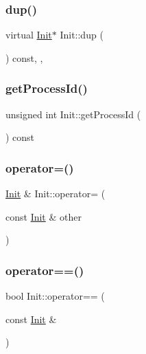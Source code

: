 \subsubsection{\texorpdfstring{dup()}{dup()}}
{\footnotesize\ttfamily virtual \hyperlink{class_init}{Init}$\ast$ Init\+::dup (\begin{DoxyParamCaption}{ }\end{DoxyParamCaption}) const\hspace{0.3cm}{\ttfamily [inline]}, {\ttfamily [override]}, {\ttfamily [virtual]}}

\mbox{\label{class_init_a73d525231ae76ad98442d6f5b86bb994}} 
\subsubsection{\texorpdfstring{get\+Process\+Id()}{getProcessId()}}
{\footnotesize\ttfamily unsigned int Init\+::get\+Process\+Id (\begin{DoxyParamCaption}{ }\end{DoxyParamCaption}) const\hspace{0.3cm}{\ttfamily [virtual]}}

\mbox{\label{class_init_ab995dd231981ed97018c00b5fd8e9797}} 
\subsubsection{\texorpdfstring{operator=()}{operator=()}}
{\footnotesize\ttfamily \hyperlink{class_init}{Init} \& Init\+::operator= (\begin{DoxyParamCaption}\item[{const \hyperlink{class_init}{Init} \&}]{other }\end{DoxyParamCaption})}

\mbox{\label{class_init_a474b7c9ffdf72a6b2b58558ce68bb03e}} 
\subsubsection{\texorpdfstring{operator==()}{operator==()}}
{\footnotesize\ttfamily bool Init\+::operator== (\begin{DoxyParamCaption}\item[{const \hyperlink{class_init}{Init} \&}]{ }\end{DoxyParamCaption})\hspace{0.3cm}{\ttfamily [protected]}}


